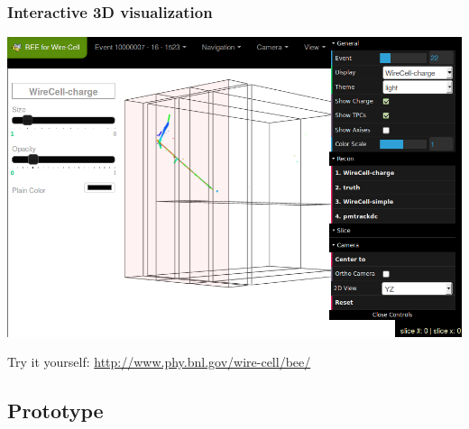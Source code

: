 \begin{frame}
  \frametitle{Interactive 3D visualization}
  \begin{center}
    \includegraphics[height=0.7\textheight]{bee-full-gui.png}    
  \end{center}
  \begin{center}
    Try it yourself: \url{http://www.phy.bnl.gov/wire-cell/bee/}
  \end{center}
\end{frame}


\subsection{Prototype}


